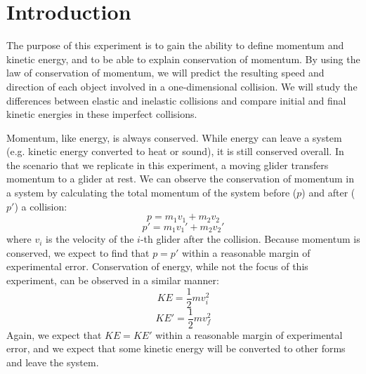 \section*{Introduction}

The purpose of this experiment is to gain the ability to define momentum and kinetic energy, and to be able to explain conservation of momentum. By using the law of conservation of momentum, we will predict the resulting speed and direction of each object involved in a one-dimensional collision. We will study the differences between elastic and inelastic collisions and compare initial and final kinetic energies in these imperfect collisions.

\bigskip

Momentum, like energy, is always conserved. While energy can leave a system (e.g. kinetic energy converted to heat or sound), it is still conserved overall. In the scenario that we replicate in this experiment, a moving glider transfers momentum to a glider at rest. We can observe the conservation of momentum in a system by calculating the total momentum of the system before ($p$) and after ($p'$) a collision:
\[ p = m_{1}v_{1} + m_{2}v_{2} \]
\[ p' = m_{1}v_{1}' + m_{2}v_{2}' \]
where $v_i$ is the velocity of the $i$-th glider after the collision. Because momentum is conserved, we expect to find that $p=p'$ within a reasonable margin of experimental error. Conservation of energy, while not the focus of this experiment, can be observed in a similar manner:
\[ KE = \frac{1}{2} mv_{i}^{2} \]
\[ KE' = \frac{1}{2} mv_{f}^{2} \]
Again, we expect that $KE=KE'$ within a reasonable margin of experimental error, and we expect that some kinetic energy will be converted to other forms and leave the system.

\bigskip